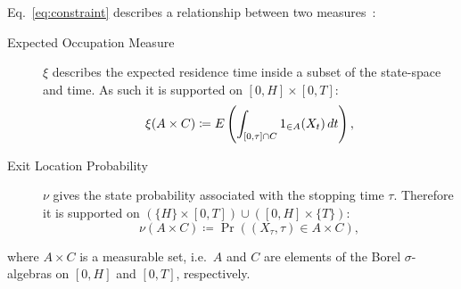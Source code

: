 Eq.~\eqref{eq:constraint}  describes a relationship between
two measures~\parencite[][Chapter~9.2]{lasserre2010moments}:
\begin{description}
\item[Expected Occupation Measure] $\xi$ describes the expected residence time inside a subset of the state-space and time. As such it is supported on $[0,H]\times [0,T]$:
\begin{equation}\label{eq:ex_occ_measure}
    \xi(A\times C) \coloneqq {E}\left(\int_{[0,\tau]\cap {C}}{1}_{\in A}(X_t)\,dt\right),
\end{equation}
\item [Exit Location Probability] $\nu$ gives the state probability associated with the stopping time $\tau$. Therefore it is supported on $(\{H\}\times[0,T]) \cup
([0,H]\times\{T\})$:
\begin{equation}\label{eq:exit_loc_measure}
    \nu(A\times C)\coloneqq \Pr((X_{\tau},\tau)\in A\times C),
\end{equation}
\end{description}
where $A\times C$ is a measurable set, i.e.\ $A$ and $C$ are elements of the Borel $\sigma$-algebras on $[0,H]$ and $[0,T]$, respectively.


